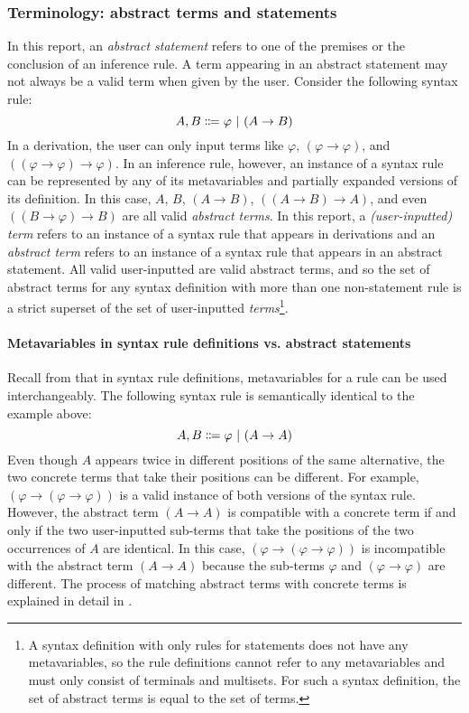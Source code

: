\subsubsection{Terminology: abstract terms and statements}
In this report, an \textit{abstract statement} refers to one of the premises or the conclusion of an inference rule. A term appearing in an abstract statement may not always be a valid term when given by the user. Consider the following syntax rule:
\[
    A, B \Coloneqq \varphi \ |\  (A \to B)
\]
In a derivation, the user can only input terms like $\varphi$, $(\varphi \to \varphi)$, and $((\varphi \to \varphi) \to \varphi)$. In an inference rule, however, an instance of a syntax rule can be represented by any of its metavariables and partially expanded versions of its definition. In this case, $A$, $B$, $(A \to B)$, $((A \to B) \to A)$, and even $((B \to \varphi) \to B)$ are all valid \textit{abstract terms}. In this report, a \textit{(user-inputted) term} refers to an instance of a syntax rule that appears in derivations and an \textit{abstract term} refers to an instance of a syntax rule that appears in an abstract statement. All valid user-inputted are valid abstract terms, and so the set of abstract terms for any syntax definition with more than one non-statement rule is a strict superset of the set of user-inputted \textit{terms}\footnote{A syntax definition with only rules for statements does not have any metavariables, so the rule definitions cannot refer to any metavariables and must only consist of terminals and multisets. For such a syntax definition, the set of abstract terms is equal to the set of terms.}.

\paragraph{Metavariables in syntax rule definitions vs. abstract statements}
Recall from  that in syntax rule definitions, metavariables for a rule can be used interchangeably. The following syntax rule is semantically identical to the example above:
\[
    A, B \Coloneqq \varphi \ |\  (A \to A)
\]
Even though $A$ appears twice in different positions of the same alternative, the two concrete terms that take their positions can be different. For example, $(\varphi \to (\varphi \to \varphi))$ is a valid instance of both versions of the syntax rule. However, the abstract term $(A \to A)$ is compatible with a concrete term if and only if the two user-inputted sub-terms that take the positions of the two occurrences of $A$ are identical. In this case, $(\varphi \to (\varphi \to \varphi))$ is incompatible with the abstract term $(A \to A)$ because the sub-terms $\varphi$ and $(\varphi \to \varphi)$ are different. The process of matching abstract terms with concrete terms is explained in detail in .

